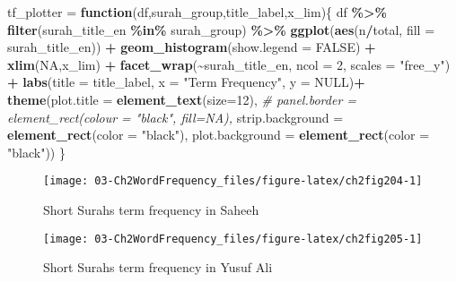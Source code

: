\documentclass[
]{article}
\newenvironment{Shaded}{\begin{snugshade}}{\end{snugshade}}
\newcommand{\AttributeTok}[1]{\textcolor[rgb]{0.13,0.29,0.53}{#1}}
\newcommand{\CommentTok}[1]{\textcolor[rgb]{0.56,0.35,0.01}{\textit{#1}}}
\newcommand{\ConstantTok}[1]{\textcolor[rgb]{0.56,0.35,0.01}{#1}}
\newcommand{\ControlFlowTok}[1]{\textcolor[rgb]{0.13,0.29,0.53}{\textbf{#1}}}
\newcommand{\DecValTok}[1]{\textcolor[rgb]{0.00,0.00,0.81}{#1}}
\newcommand{\FunctionTok}[1]{\textcolor[rgb]{0.13,0.29,0.53}{\textbf{#1}}}
\newcommand{\NormalTok}[1]{#1}
\newcommand{\OtherTok}[1]{\textcolor[rgb]{0.56,0.35,0.01}{#1}}
\newcommand{\SpecialCharTok}[1]{\textcolor[rgb]{0.81,0.36,0.00}{\textbf{#1}}}
\newcommand{\StringTok}[1]{\textcolor[rgb]{0.31,0.60,0.02}{#1}}
\begin{document}
\begin{Shaded}
\begin{Highlighting}[]
\NormalTok{tf\_plotter }\OtherTok{=} \ControlFlowTok{function}\NormalTok{(df,surah\_group,title\_label,x\_lim)\{}
\NormalTok{  df }\SpecialCharTok{\%\textgreater{}\%} 
  \FunctionTok{filter}\NormalTok{(surah\_title\_en }\SpecialCharTok{\%in\%}\NormalTok{ surah\_group) }\SpecialCharTok{\%\textgreater{}\%}
  \FunctionTok{ggplot}\NormalTok{(}\FunctionTok{aes}\NormalTok{(n}\SpecialCharTok{/}\NormalTok{total, }\AttributeTok{fill =}\NormalTok{ surah\_title\_en)) }\SpecialCharTok{+}
  \FunctionTok{geom\_histogram}\NormalTok{(}\AttributeTok{show.legend =} \ConstantTok{FALSE}\NormalTok{) }\SpecialCharTok{+}
  \FunctionTok{xlim}\NormalTok{(}\ConstantTok{NA}\NormalTok{,x\_lim) }\SpecialCharTok{+}
  \FunctionTok{facet\_wrap}\NormalTok{(}\SpecialCharTok{\textasciitilde{}}\NormalTok{surah\_title\_en, }\AttributeTok{ncol =} \DecValTok{2}\NormalTok{, }\AttributeTok{scales =} \StringTok{"free\_y"}\NormalTok{) }\SpecialCharTok{+}
  \FunctionTok{labs}\NormalTok{(}\AttributeTok{title =}\NormalTok{ title\_label,}
       \AttributeTok{x =} \StringTok{"Term Frequency"}\NormalTok{,}
       \AttributeTok{y =} \ConstantTok{NULL}\NormalTok{)}\SpecialCharTok{+} 
  \FunctionTok{theme}\NormalTok{(}\AttributeTok{plot.title =} \FunctionTok{element\_text}\NormalTok{(}\AttributeTok{size=}\DecValTok{12}\NormalTok{),}
        \CommentTok{\# panel.border = element\_rect(colour = "black", fill=NA),}
        \AttributeTok{strip.background =} \FunctionTok{element\_rect}\NormalTok{(}\AttributeTok{color =} \StringTok{"black"}\NormalTok{),}
        \AttributeTok{plot.background =} \FunctionTok{element\_rect}\NormalTok{(}\AttributeTok{color =} \StringTok{"black"}\NormalTok{))}
\NormalTok{\}}
\end{Highlighting}
\end{Shaded}

\begin{figure}

{\centering \texttt{[image: 03-Ch2WordFrequency\_files/figure-latex/ch2fig204-1]} 

}

\caption{Short Surahs term frequency in Saheeh}\label{fig:ch2fig204}
\end{figure}

\begin{figure}

{\centering \texttt{[image: 03-Ch2WordFrequency\_files/figure-latex/ch2fig205-1]} 

}

\caption{Short Surahs term frequency in Yusuf Ali}\label{fig:ch2fig205}
\end{figure}
\end{document}

